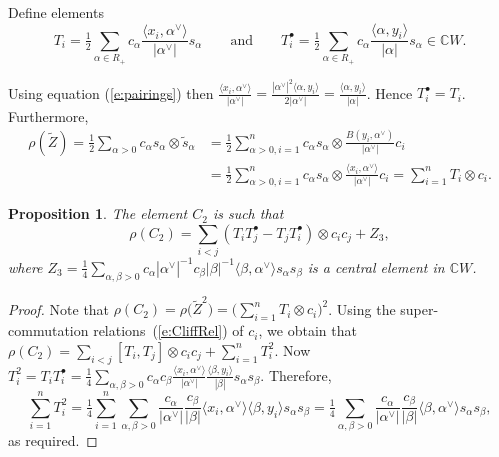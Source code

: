 \documentclass[10pt,a4paper]{amsart}
\numberwithin{equation}{section}
\newtheorem{Proposition}[Theorem]{Proposition}
 { \theoremstyle{definition}
\newtheorem{Definition}[Theorem]{Definition}
\newtheorem{Note}[Theorem]{Note}
\newtheorem{Example}[Theorem]{Example}
\newtheorem{Remark}[Theorem]{Remark} }
\begin{document}
\begin{Definition}
Define elements
\[T_i = \tfrac{1}{2}\sum_{\alpha \in R_+} c_\alpha \frac{\langle x_i,\alpha^\vee\rangle}{|\alpha^\vee|} s_\alpha \qquad \text{and}\qquad T_i^\bullet =\tfrac{1}{2} \sum_{\alpha \in R_+} c_\alpha \frac{\langle \alpha,y_i\rangle}{|\alpha|} s_\alpha \in \mathbb{C}W.\] \end{Definition}
Using equation (\ref{e:pairings}) then $\frac{\langle x_i,\alpha^\vee \rangle}{|\alpha^\vee|} = \frac{|\alpha^\vee|^2\langle \alpha,y_i\rangle}{2|\alpha^\vee|} = \frac{\langle \alpha,y_i\rangle}{|\alpha|}$. Hence $T_i^\bullet =T_i$. Furthermore,
\begin{align*}
\rho(\tilde{Z}) = \tfrac{1}{2}\sum_{\alpha >0} c_\alpha s_\alpha \otimes \tilde{s}_\alpha &= \tfrac{1}{2}\sum_{\alpha >0, i =1}^n c_\alpha s_\alpha \otimes \frac{B(y_i,\alpha^\vee)}{|\alpha^\vee|}c_i \\
&= \tfrac{1}{2}\sum_{\alpha >0, i =1}^n c_\alpha s_\alpha \otimes \frac{\langle x_i,\alpha^\vee\rangle }{|\alpha^\vee|}c_i = \sum_{i=1}^n T_i \otimes c_i.
\end{align*}

\begin{Proposition}
The element $C_2$ is such that
\[\rho(C_2) = \sum_{i <j} (T_iT_j^\bullet - T_jT_i^\bullet)\otimes c_ic_j + Z_3,
\]
where $Z_3 = \tfrac{1}{4}\sum_{\alpha ,\beta >0}c_\alpha |\alpha^\vee|^{-1} c_\beta |\beta|^{-1} \langle \beta,\alpha^\vee\rangle s_\alpha s_\beta$ is a central element in $\mathbb{C}W$.
\end{Proposition}

\begin{proof}
Note that $\rho(C_2) = \rho\big(\tilde{Z}^2\big) = \big(\sum_{i=1}^n T_i \otimes c_i\big)^2$. Using the super-commutation relations~(\ref{e:CliffRel}) of $c_i$, we obtain that
$\rho(C_2) = \sum_{i<j} [T_i,T_j] \otimes c_ic_j + \sum_{i=1}^n T_i^2$.
Now $T_i^2 = T_iT_i^\bullet = \tfrac{1}{4}\sum_{\alpha ,\beta >0}c_\alpha c_\beta \frac{ \langle x_i,\alpha^\vee\rangle}{|\alpha^\vee|}\frac{\langle \beta,y_i\rangle}{|\beta|} s_\alpha s_\beta$. Therefore,
\[
\sum_{i=1}^n T_i^2 =\tfrac{1}{4}\sum_{i=1}^n \sum_{\alpha ,\beta >0}\frac{c_\alpha}{|\alpha^\vee|} \frac{c_\beta}{|\beta|} \langle x_i,\alpha^\vee\rangle \langle \beta,y_i\rangle s_\alpha s_\beta
= \tfrac{1}{4}\sum_{\alpha ,\beta >0}\frac{c_\alpha}{|\alpha^\vee|} \frac{c_\beta}{|\beta|} \langle \beta,\alpha^\vee\rangle s_\alpha s_\beta ,\]
as required.
\end{proof}
\end{document}

